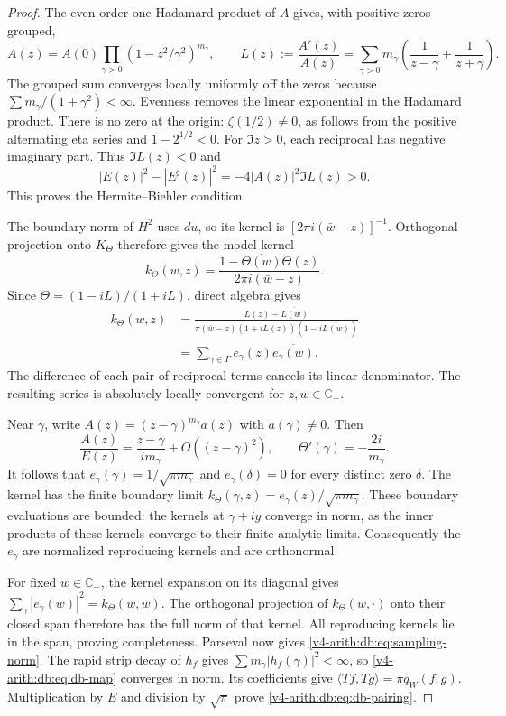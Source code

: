 \begin{proof}
The even order-one Hadamard product of $A$ gives, with positive zeros grouped,
\[
 A(z)=A(0)\prod_{\gamma>0}(1-z^2/\gamma^2)^{m_\gamma},\qquad
 L(z):=\frac{A'(z)}{A(z)}
   =\sum_{\gamma>0}m_\gamma
          \left(\frac1{z-\gamma}+\frac1{z+\gamma}\right).
\]
The grouped sum converges locally uniformly off the zeros because
$\sum m_\gamma/(1+\gamma^2)<\infty$.
Evenness removes the linear exponential in the Hadamard product.
There is no zero at the origin: $\zeta(1/2)\ne0$, as follows from
the positive alternating eta series and $1-2^{1/2}<0$.
For $\Im z>0$, each reciprocal has negative imaginary part.
Thus $\Im L(z)<0$ and
\[
 |E(z)|^2-|E^\sharp(z)|^2=-4|A(z)|^2\Im L(z)>0.
\]
This proves the Hermite--Biehler condition.

The boundary norm of $H^2$ uses $du$, so its kernel is
$[2\pi i(\bar w-z)]^{-1}$.
Orthogonal projection onto $K_\Theta$ therefore gives the model kernel
\[
 k_\Theta(w,z)=\frac{1-\overline{\Theta(w)}\Theta(z)}{2\pi i(\bar w-z)}.
\]
Since $\Theta=(1-iL)/(1+iL)$, direct algebra gives
\begin{align*}
 k_\Theta(w,z)
 &=\frac{L(z)-\overline{L(w)}}{
       \pi(\bar w-z)(1+iL(z))(1-i\overline{L(w)})}\\
 &=\sum_{\gamma\in\Gamma}e_\gamma(z)\overline{e_\gamma(w)}.
\end{align*}
The difference of each pair of reciprocal terms cancels its linear denominator.
The resulting series is absolutely locally convergent for $z,w\in\mathbb C_+$.

Near $\gamma$, write $A(z)=(z-\gamma)^{m_\gamma}a(z)$ with $a(\gamma)\ne0$.
Then
\[
 \frac{A(z)}{E(z)}=\frac{z-\gamma}{im_\gamma}+O((z-\gamma)^2),\qquad
 \Theta'(\gamma)=-\frac{2i}{m_\gamma}.
\]
It follows that
$e_\gamma(\gamma)=1/\sqrt{\pi m_\gamma}$ and
$e_\gamma(\delta)=0$ for every distinct zero $\delta$.
The kernel has the finite boundary limit
$k_\Theta(\gamma,z)=e_\gamma(z)/\sqrt{\pi m_\gamma}$.
These boundary evaluations are bounded: the kernels at $\gamma+iy$
converge in norm, as the inner products of these kernels converge to their finite analytic limits.
Consequently the $e_\gamma$ are normalized reproducing kernels and are orthonormal.

For fixed $w\in\mathbb C_+$, the kernel expansion on its diagonal gives
$\sum_\gamma|e_\gamma(w)|^2=k_\Theta(w,w)$.
The orthogonal projection of $k_\Theta(w,\cdot)$ onto their closed span
therefore has the full norm of that kernel.
All reproducing kernels lie in the span, proving completeness.
Parseval now gives \eqref{v4-arith:db:eq:sampling-norm}.
The rapid strip decay of $h_f$ gives
$\sum m_\gamma|h_f(\gamma)|^2<\infty$, so \eqref{v4-arith:db:eq:db-map} converges in norm.
Its coefficients give
$\langle Tf,Tg\rangle=\pi q_W(f,g)$.
Multiplication by $E$ and division by $\sqrt\pi$ prove \eqref{v4-arith:db:eq:db-pairing}.
\end{proof}

